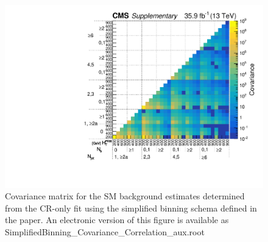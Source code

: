 \clearpage
\begin{figure}
  \centering
  \includegraphics[width=\textwidth]{Supplementary/CMS-SUS-16-038_Figure-aux_010}
  \caption{Covariance matrix for the SM background estimates
    determined from the CR-only fit using the simplified binning
	schema defined in the paper.
	An electronic version of this figure is available as SimplifiedBinning\_Covariance\_Correlation\_aux.root
	} %
  \label{fig:covariance_aux}
\end{figure} 
\clearpage

